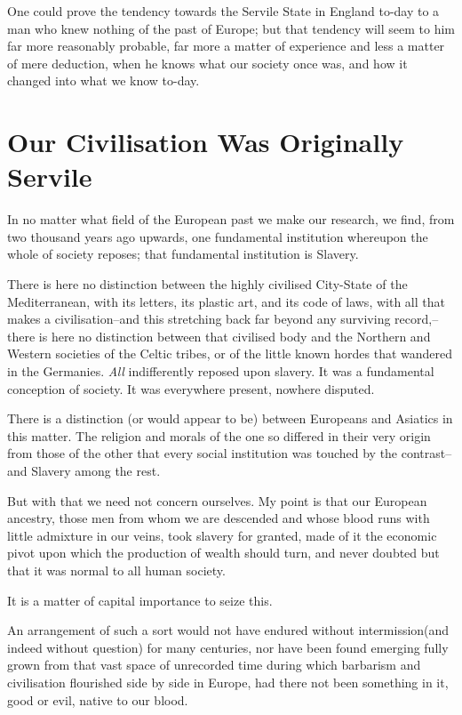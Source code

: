 \documentclass{book}
\begin{document}
One could prove the tendency towards the Servile State in England to-day to a man who knew nothing of the past of Europe; but that tendency will seem to him far more reasonably probable, far more a matter of experience and less a matter of mere deduction, when he knows what our society once was, and how it changed into what we know to-day.

\chapter{Our Civilisation Was Originally Servile}
\label{chapter-2}
In no matter what field of the European past we make our research, we find, from two thousand years ago upwards, one fundamental institution whereupon the whole of society reposes; that fundamental institution is Slavery.

There is here no distinction between the highly civilised City-State of the Mediterranean, with its letters, its plastic art, and its code of laws, with all that makes a civilisation–and this stretching back far beyond any surviving record,–there is here no distinction between that civilised body and the Northern and Western societies of the Celtic tribes, or of the little known hordes that wandered in the Germanies. \emph{All} indifferently reposed upon slavery. It was a fundamental conception of society. It was everywhere present, nowhere disputed.

There is a distinction (or would appear to be) between Europeans and Asiatics in this matter. The religion and morals of the one so differed in their very origin from those of the other that every social institution was touched by the contrast–and Slavery among the rest.

But with that we need not concern ourselves. My point is that our European ancestry, those men from whom we are descended and whose blood runs with little admixture in our veins, took slavery for granted, made of it the economic pivot upon which the production of wealth should turn, and never doubted but that it was normal to all human society.

It is a matter of capital importance to seize this.

An arrangement of such a sort would not have endured without intermission(and indeed without question) for many centuries, nor have been found emerging fully grown from that vast space of unrecorded time during which barbarism and civilisation flourished side by side in Europe, had there not been something in it, good or evil, native to our blood.
\end{document}
